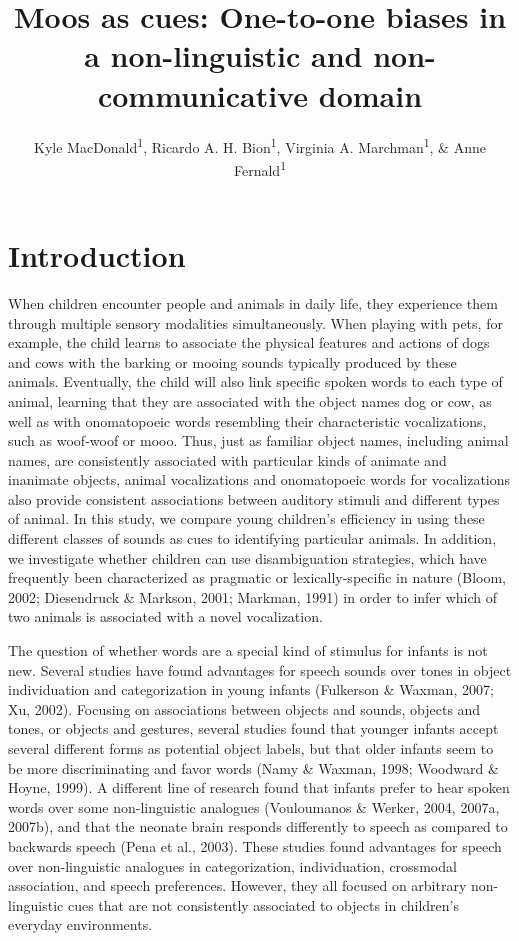 \documentclass[english,floatsintext,man]{apa6}
\title{Moos as cues: One-to-one biases in a non-linguistic and
non-communicative domain}
\author{Kyle MacDonald\textsuperscript{1}, Ricardo A. H. Bion\textsuperscript{1}, Virginia A. Marchman\textsuperscript{1}, \& Anne Fernald\textsuperscript{1}}
\affiliation{
    \vspace{0.5cm}
          \textsuperscript{1} Stanford University  }
\theoremstyle{definition}
\theoremstyle{definition}
\theoremstyle{definition}
\theoremstyle{remark}
\begin{document}
\maketitle

\setcounter{secnumdepth}{0}



\section{Introduction}\label{introduction}

When children encounter people and animals in daily life, they
experience them through multiple sensory modalities simultaneously. When
playing with pets, for example, the child learns to associate the
physical features and actions of dogs and cows with the barking or
mooing sounds typically produced by these animals. Eventually, the child
will also link specific spoken words to each type of animal, learning
that they are associated with the object names dog or cow, as well as
with onomatopoeic words resembling their characteristic vocalizations,
such as woof-woof or mooo. Thus, just as familiar object names,
including animal names, are consistently associated with particular
kinds of animate and inanimate objects, animal vocalizations and
onomatopoeic words for vocalizations also provide consistent
associations between auditory stimuli and different types of animal. In
this study, we compare young children's efficiency in using these
different classes of sounds as cues to identifying particular animals.
In addition, we investigate whether children can use disambiguation
strategies, which have frequently been characterized as pragmatic or
lexically-specific in nature (Bloom, 2002; Diesendruck \& Markson, 2001;
Markman, 1991) in order to infer which of two animals is associated with
a novel vocalization.

The question of whether words are a special kind of stimulus for infants
is not new. Several studies have found advantages for speech sounds over
tones in object individuation and categorization in young infants
(Fulkerson \& Waxman, 2007; Xu, 2002). Focusing on associations between
objects and sounds, objects and tones, or objects and gestures, several
studies found that younger infants accept several different forms as
potential object labels, but that older infants seem to be more
discriminating and favor words (Namy \& Waxman, 1998; Woodward \& Hoyne,
1999). A different line of research found that infants prefer to hear
spoken words over some non-linguistic analogues (Vouloumanos \& Werker,
2004, 2007a, 2007b), and that the neonate brain responds differently to
speech as compared to backwards speech (Pena et al., 2003). These
studies found advantages for speech over non-linguistic analogues in
categorization, individuation, crossmodal association, and speech
preferences. However, they all focused on arbitrary non-linguistic cues
that are not consistently associated to objects in children's everyday
environments.
\end{document}
